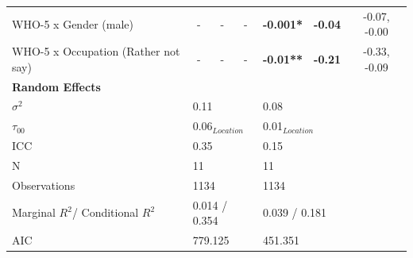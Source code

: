 {\begin{landscape}
\begin{table}[hp]
\begin{tabular}{@{}lcccccc@{}}
        WHO-5 x Gender %
        (male)             & -                                         & -                                        & \multicolumn{1}{c|}{-}                & \textbf{-0.001*}   & \textbf{-0.04}     & -0.07, -0.00     \\
        WHO-5 x Occupation %
        (Rather not say)   & -                                         & -                                        & \multicolumn{1}{c|}{-}                & \textbf{-0.01**}   & \textbf{-0.21}     & -0.33, -0.09     \\
        \midrule
        \multicolumn{7}{l}{\textbf{Random Effects}}                                                                                                                                                                    \\
        \midrule
        $\sigma^2$         & \multicolumn{3}{l|}{0.11}                 & \multicolumn{3}{l}{0.08}                                                                                                                      \\
        $\tau_{00}$        & \multicolumn{3}{l|}{0.06$_{Location}$}    & \multicolumn{3}{l}{0.01$_{Location}$}                                                                                                         \\
        ICC                & \multicolumn{3}{l|}{0.35}                 & \multicolumn{3}{l}{0.15}                                                                                                                      \\
        N                  & \multicolumn{3}{l|}{11}                   & \multicolumn{3}{l}{11}                                                                                                                        \\
        \midrule
        Observations       & \multicolumn{3}{l|}{1134}                 & \multicolumn{3}{l}{1134}                                                                                                                      \\
        Marginal $R^2$/%
        Conditional $R^2$  & \multicolumn{3}{l|}{0.014 / 0.354}        & \multicolumn{3}{l}{0.039 / 0.181}                                                                                                             \\
        AIC                & \multicolumn{3}{l|}{779.125}              & \multicolumn{3}{l}{451.351}                                                                                                                   \\
        \bottomrule
      \end{tabular}
    \end{table}
  \end{landscape}
}

